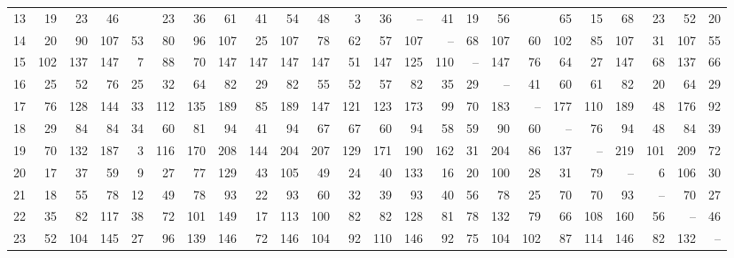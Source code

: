 \documentclass[11pt]{article}
\theoremstyle{definition}
\theoremstyle{remark}
\begin{document}
\begin{landscape}
\begin{table}[p]
{\begin{tabular}{@{}r|rrrrrrrrrrrrrrrrrrrrrrr@{}}
13 & 19 & 23 & 46 & & 23 & 36 & 61 & 41 & 54 & 48 & 3 & 36 & -- & 41 & 19 & 56 & & 65 & 15 & 68 & 23 & 52 & 20 \\
14 & 20 & 90 & 107 & 53 & 80 & 96 & 107 & 25 & 107 & 78 & 62 & 57 & 107 & -- & 68 & 107 & 60 & 102 & 85 & 107 & 31 & 107 & 55 \\
15 & 102 & 137 & 147 & 7 & 88 & 70 & 147 & 147 & 147 & 147 & 51 & 147 & 125 & 110 & -- & 147 & 76 & 64 & 27 & 147 & 68 & 137 & 66 \\
16 & 25 & 52 & 76 & 25 & 32 & 64 & 82 & 29 & 82 & 55 & 52 & 57 & 82 & 35 & 29 & -- & 41 & 60 & 61 & 82 & 20 & 64 & 29 \\
17 & 76 & 128 & 144 & 33 & 112 & 135 & 189 & 85 & 189 & 147 & 121 & 123 & 173 & 99 & 70 & 183 & -- & 177 & 110 & 189 & 48 & 176 & 92 \\
18 & 29 & 84 & 84 & 34 & 60 & 81 & 94 & 41 & 94 & 67 & 67 & 60 & 94 & 58 & 59 & 90 & 60 & -- & 76 & 94 & 48 & 84 & 39 \\
19 & 70 & 132 & 187 & 3 & 116 & 170 & 208 & 144 & 204 & 207 & 129 & 171 & 190 & 162 & 31 & 204 & 86 & 137 & -- & 219 & 101 & 209 & 72 \\
20 & 17 & 37 & 59 & 9 & 27 & 77 & 129 & 43 & 105 & 49 & 24 & 40 & 133 & 16 & 20 & 100 & 28 & 31 & 79 & -- & 6 & 106 & 30 \\
21 & 18 & 55 & 78 & 12 & 49 & 78 & 93 & 22 & 93 & 60 & 32 & 39 & 93 & 40 & 56 & 78 & 25 & 70 & 70 & 93 & -- & 70 & 27 \\
22 & 35 & 82 & 117 & 38 & 72 & 101 & 149 & 17 & 113 & 100 & 82 & 82 & 128 & 81 & 78 & 132 & 79 & 66 & 108 & 160 & 56 & -- & 46 \\
23 & 52 & 104 & 145 & 27 & 96 & 139 & 146 & 72 & 146 & 104 & 92 & 110 & 146 & 92 & 75 & 104 & 102 & 87 & 114 & 146 & 82 & 132 & -- \\
\bottomrule
\end{tabular}
}
\end{table}


\end{landscape}
\end{document}
